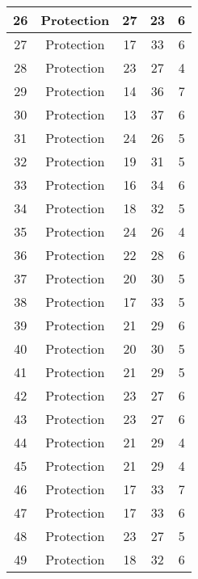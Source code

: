\documentclass[results.tex]{subfiles}
\begin{document}
\begin{center}
\begin{tabular}{| c || c | c | c | c |}
    \hline
    26 & Protection & 27 & 23 & 6 \\ 
    \hline
    27 & Protection & 17 & 33 & 6 \\ 
    \hline
    28 & Protection & 23 & 27 & 4 \\ 
    \hline
    29 & Protection & 14 & 36 & 7 \\ 
    \hline
    30 & Protection & 13 & 37 & 6 \\ 
    \hline
    31 & Protection & 24 & 26 & 5 \\ 
    \hline
    32 & Protection & 19 & 31 & 5 \\ 
    \hline
    33 & Protection & 16 & 34 & 6 \\ 
    \hline
    34 & Protection & 18 & 32 & 5 \\ 
    \hline
    35 & Protection & 24 & 26 & 4 \\ 
    \hline
    36 & Protection & 22 & 28 & 6 \\ 
    \hline
    37 & Protection & 20 & 30 & 5 \\ 
    \hline
    38 & Protection & 17 & 33 & 5 \\ 
    \hline
    39 & Protection & 21 & 29 & 6 \\ 
    \hline
    40 & Protection & 20 & 30 & 5 \\ 
    \hline
    41 & Protection & 21 & 29 & 5 \\ 
    \hline
    42 & Protection & 23 & 27 & 6 \\ 
    \hline
    43 & Protection & 23 & 27 & 6 \\ 
    \hline
    44 & Protection & 21 & 29 & 4 \\ 
    \hline
    45 & Protection & 21 & 29 & 4 \\ 
    \hline
    46 & Protection & 17 & 33 & 7 \\ 
    \hline
    47 & Protection & 17 & 33 & 6 \\ 
    \hline
    48 & Protection & 23 & 27 & 5 \\ 
    \hline
    49 & Protection & 18 & 32 & 6 \\ 
    \hline   \end{tabular}
\end{center}
\end{document}
